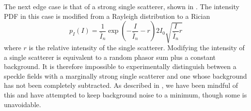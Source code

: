 The next edge case is that of a strong single scatterer, shown in 
.  The intensity PDF in this case is modified
from a Rayleigh distribution to a Rician~\cite{goodman2007speckle} 
\begin{equation}
p_I(I) = \frac{1}{\bar{I}_n} \exp\left(-\frac{I}{\bar{I}_n} - r\right) 2 I_0
\sqrt{\frac{I}{\bar{I}_n} r}
\label{ricedpf}
\end{equation}
where $r$ is the relative intensity of the single scatterer.  Modifying the
intensity of a single scatterer is equivalent to a random phasor sum plus a
constant background.  It is therefore impossible to experimentally
distinguish between a speckle fields with a marginally strong single
scatterer and one whose background has not been completely subtracted.  
As described in , we have been mindful of this
and have attempted to keep background noise to a minimum, though some is
unavoidable.
